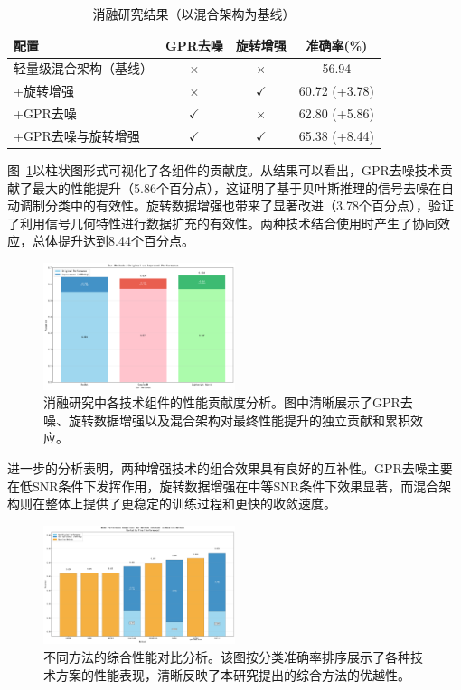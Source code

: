 \documentclass[conference]{IEEEtran}
\begin{document}
\begin{table}[h]
\centering
\caption{消融研究结果（以混合架构为基线）}
\label{tab:ablation_study}
\begin{tabular}{@{}lccc@{}}
\toprule
配置 & GPR去噪 & 旋转增强 & 准确率(\%) \\
\midrule
轻量级混合架构（基线） & $\times$ & $\times$ & 56.94 \\
+旋转增强 & $\times$ & $\checkmark$ & 60.72 (+3.78) \\
+GPR去噪 & $\checkmark$ & $\times$ & 62.80 (+5.86) \\
+GPR去噪与旋转增强 & $\checkmark$ & $\checkmark$ & 65.38 (+8.44) \\
\bottomrule
\end{tabular}
\end{table}

图~\ref{fig:ablation_components}以柱状图形式可视化了各组件的贡献度。从结果可以看出，GPR去噪技术贡献了最大的性能提升（5.86个百分点），这证明了基于贝叶斯推理的信号去噪在自动调制分类中的有效性。旋转数据增强也带来了显著改进（3.78个百分点），验证了利用信号几何特性进行数据扩充的有效性。两种技术结合使用时产生了协同效应，总体提升达到8.44个百分点。

\begin{figure}[htbp]
\centering
\includegraphics[width=0.5\textwidth]{figure/stacked_improvement.png}
\caption{消融研究中各技术组件的性能贡献度分析。图中清晰展示了GPR去噪、旋转数据增强以及混合架构对最终性能提升的独立贡献和累积效应。}
\label{fig:ablation_components}
\end{figure}

进一步的分析表明，两种增强技术的组合效果具有良好的互补性。GPR去噪主要在低SNR条件下发挥作用，旋转数据增强在中等SNR条件下效果显著，而混合架构则在整体上提供了更稳定的训练过程和更快的收敛速度。

\begin{figure}[htbp]
\centering
\includegraphics[width=0.5\textwidth]{figure/sorted_stacked_comparison.png}
\caption{不同方法的综合性能对比分析。该图按分类准确率排序展示了各种技术方案的性能表现，清晰反映了本研究提出的综合方法的优越性。}
\label{fig:method_comparison}
\end{figure}
\end{document}
